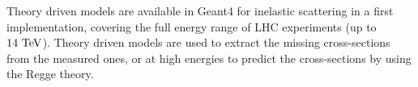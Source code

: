 Theory driven models are available in Geant4 for inelastic scattering
in a first implementation, covering the full energy range of LHC
experiments (up to $\rm14~TeV$). Theory driven models are used to
extract the missing cross-sections from the measured ones, or at high
energies to predict the cross-sections by using the Regge theory.


